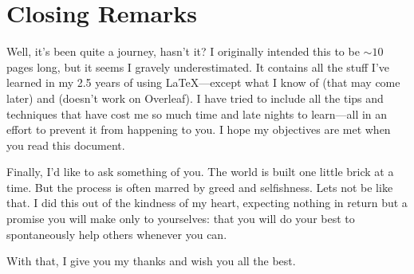 \chapter{Closing Remarks}
%
Well, it's been quite a journey, hasn't it? I originally intended this
to be $\sim 10$ pages long, but it seems I gravely underestimated.  It
contains all the stuff I've learned in my 2.5 years of using
\LaTeX---except what I know of  (that may come later) and
 (doesn't work on Overleaf).  I have tried to include all
the tips and techniques that have cost me so much time and late nights
to learn---all in an effort to prevent it from happening to you.  I
hope my objectives are met when you read this document.

Finally, I'd like to ask something of you.  The world is built one
little brick at a time.  But the process is often marred by greed and
selfishness.  Lets not be like that.  I did this out of the kindness
of my heart, expecting nothing in return but a promise you will make
only to yourselves: that you will do your best to spontaneously help
others whenever you can.

With that, I give you my thanks and wish you all the best.
%
\nocite{*}
